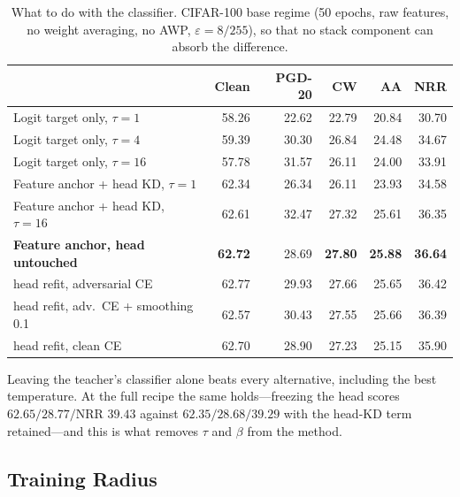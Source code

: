 \begin{table}[t]
  \centering
  \caption{What to do with the classifier. CIFAR-100 base regime (50 epochs, raw features, no weight
  averaging, no AWP, $\varepsilon=8/255$), so that no stack component can absorb the difference.}
  \label{tab:head}
  \begin{tabular}{lrrrrr}
    \toprule
    & Clean & PGD-20 & CW & AA & NRR \\
    \midrule
    Logit target only, $\tau=1$               & 58.26 & 22.62 & 22.79 & 20.84 & 30.70 \\
    Logit target only, $\tau=4$               & 59.39 & 30.30 & 26.84 & 24.48 & 34.67 \\
    Logit target only, $\tau=16$              & 57.78 & 31.57 & 26.11 & 24.00 & 33.91 \\
    Feature anchor + head KD, $\tau=1$        & 62.34 & 26.34 & 26.11 & 23.93 & 34.58 \\
    Feature anchor + head KD, $\tau=16$       & 62.61 & 32.47 & 27.32 & 25.61 & 36.35 \\
    \textbf{Feature anchor, head untouched}   & \textbf{62.72} & 28.69 & \textbf{27.80} & \textbf{25.88} & \textbf{36.64} \\
    \quad head refit, adversarial CE          & 62.77 & 29.93 & 27.66 & 25.65 & 36.42 \\
    \quad head refit, adv.\ CE + smoothing 0.1& 62.57 & 30.43 & 27.55 & 25.66 & 36.39 \\
    \quad head refit, clean CE                & 62.70 & 28.90 & 27.23 & 25.15 & 35.90 \\
    \bottomrule
  \end{tabular}
\end{table}

Leaving the teacher's classifier alone beats every alternative, including the best temperature. At the
full recipe the same holds---freezing the head scores $62.65/28.77/$NRR $39.43$ against
$62.35/28.68/39.29$ with the head-KD term retained---and this is what removes $\tau$ and $\beta$ from
the method.

\subsection{Training Radius}
\label{sec:radius}

